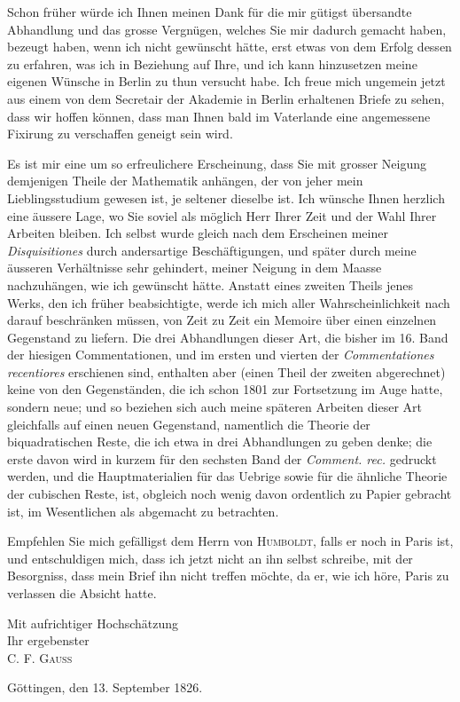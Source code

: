 \documentclass[11pt]{article}
\newcommand{\scn}[1]{\textsc{#1}}
\begin{document}
Schon früher würde ich Ihnen meinen Dank für die mir gütigst übersandte Abhandlung und das grosse Vergnügen, welches Sie mir dadurch gemacht haben, bezeugt haben, wenn ich nicht gewünscht hätte, erst etwas von dem Erfolg dessen zu erfahren, was ich in Beziehung auf Ihre, und ich kann hinzusetzen meine eigenen Wünsche in Berlin zu thun versucht habe. Ich freue mich ungemein jetzt aus einem von dem Secretair der Akademie in Berlin erhaltenen Briefe zu sehen, dass wir hoffen können, dass man Ihnen bald im Vaterlande eine angemessene Fixirung zu verschaffen geneigt sein wird.

Es ist mir eine um so erfreulichere Erscheinung, dass Sie mit grosser Neigung demjenigen Theile der Mathematik anhängen, der von jeher mein Lieblingsstudium gewesen ist, je seltener dieselbe ist. Ich wünsche Ihnen herzlich eine äussere Lage, wo Sie soviel als möglich Herr Ihrer Zeit und der Wahl Ihrer Arbeiten bleiben. Ich selbst wurde gleich nach dem Erscheinen meiner \emph{Disquisitiones} durch andersartige Beschäftigungen, und später durch meine äusseren Verhältnisse sehr gehindert, meiner Neigung in dem Maasse nachzuhängen, wie ich gewünscht hätte. Anstatt eines zweiten Theils jenes Werks, den ich früher beabsichtigte, werde ich mich aller Wahrscheinlichkeit nach darauf beschränken müssen, von Zeit zu Zeit ein Memoire über einen einzelnen Gegenstand zu liefern. Die drei Abhandlungen dieser Art, die bisher im 16. Band der hiesigen Commentationen, und im ersten und vierten der \emph{Commentationes recentiores} erschienen sind, enthalten aber (einen Theil der zweiten abgerechnet) keine von den Gegenständen, die ich schon 1801 zur Fortsetzung im Auge hatte, sondern neue; und so beziehen sich auch meine späteren Arbeiten dieser Art gleichfalls auf einen neuen Gegenstand, namentlich die Theorie der biquadratischen Reste, die ich etwa in drei Abhandlungen zu geben denke; die erste davon wird in kurzem für den sechsten Band der \emph{Comment. rec.} gedruckt werden, und die Hauptmaterialien für das Uebrige sowie für die ähnliche Theorie der cubischen Reste, ist, obgleich noch wenig davon ordentlich zu Papier gebracht ist, im Wesentlichen als abgemacht zu betrachten.

Empfehlen Sie mich gefälligst dem Herrn von \scn{Humboldt}, falls er noch in Paris ist, und entschuldigen mich, dass ich jetzt nicht an ihn selbst schreibe, mit der Besorgniss, dass mein Brief ihn nicht treffen möchte, da er, wie ich höre, Paris zu verlassen die Absicht hatte.

\begin{flushright}
Mit aufrichtiger Hochschätzung\\
Ihr ergebenster\\
\scn{C. F. Gauss}
\end{flushright}
Göttingen, den 13. September 1826.
\end{document}
